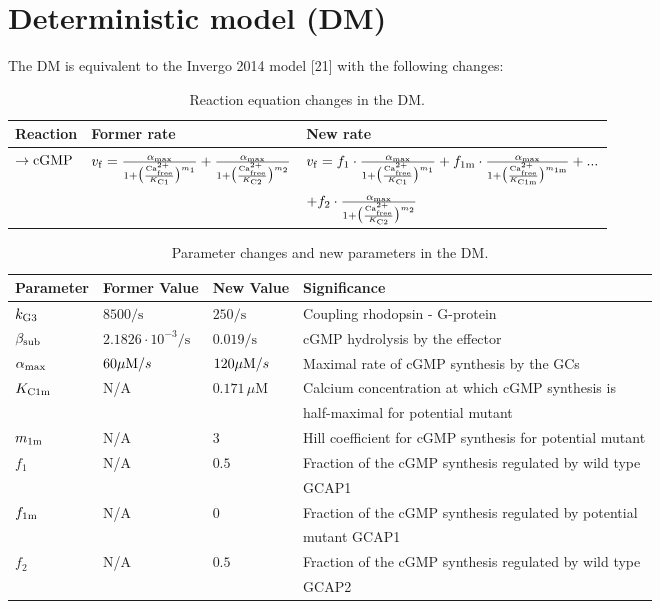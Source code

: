\documentclass[a4paper, 12pt]{book}
\begin{document}
\pagestyle{empty}

\section*{Deterministic model (DM)}

The DM is equivalent to the Invergo 2014 model [21] with the following changes:

\begin{table}[H]
\centering
\caption{Reaction equation changes in the DM.}
\label{tab_det_model}
\begin{tabular}{l | l | l}
Reaction & Former rate & New rate\\
\hline
\hline
$\rightarrow {\rm cGMP}$ & $v_{\rm f} = \frac{\alpha_{\rm max}}{1 + \bigl( \frac{{\rm Ca}^{2+}_{\rm free}}{K_{\rm C1}} \bigr)^{m_1}  } + \frac{\alpha_{\rm max}}{1 + \bigl( \frac{{\rm Ca}^{2+}_{\rm free}}{K_{\rm C2}} \bigr)^{m_2}  }  $ & $v_{\rm f} = f_1 \cdot \frac{\alpha_{\rm max}}{1+\bigl( \frac{{\rm Ca}^{2+}_{\rm free}}{K_{\rm C1}}\bigr)^{m_1}} + f_{\rm 1m} \cdot \frac{\alpha_{\rm max}}{1+\bigl( \frac{{\rm Ca}^{2+}_{\rm free}}{K_{\rm C1m}}\bigr)^{m_{\rm 1m}}} + ...$\\
 & & $ + f_2 \cdot \frac{\alpha_{\rm max}}{1+\bigl( \frac{{\rm Ca}^{2+}_{\rm free}}{K_{\rm C2}}\bigr)^{m_2}}$
\end{tabular}
\end{table}

\begin{table}[H]
\centering
\caption{Parameter changes and new parameters in the DM.}
\label{tab_det_model}
\begin{tabular}{l | l | l | l}
Parameter & Former Value & New Value & Significance\\
\hline
\hline
$k_{\rm G3}$ & $8500/\mathrm{s}$ & $250/\mathrm{s}$ & Coupling rhodopsin - G-protein\\
\hline
$\beta_{\rm sub}$ & $2.1826 \cdot 10^{-3}/\mathrm{s}$ & $0.019/\mathrm{s}$ & cGMP hydrolysis by the effector\\
\hline
$\alpha_{\rm max}$ & $60 \mu {\rm M}/s$ & $120 \mu {\rm M}/s$ & Maximal rate of cGMP synthesis by the GCs\\
\hline
$K_{\rm C1m}$ & N/A & $ 0.171\,\mu\mathrm{M}$ & Calcium concentration at which cGMP synthesis is\\
 & & &  half-maximal for potential mutant\\
\hline
$m_{\rm 1m}$ & N/A & $3$ & Hill coefficient for cGMP synthesis for potential mutant\\
\hline
$f_1$ & N/A & $0.5$ & Fraction of the cGMP synthesis regulated by wild type\\
 & & & GCAP1\\
\hline
$f_{\rm 1m}$ & N/A & $0$ & Fraction of the cGMP synthesis regulated by potential\\
 & & & mutant GCAP1\\
\hline
$f_2$ & N/A & $0.5$ & Fraction of the cGMP synthesis regulated by wild type\\
 & & & GCAP2\\
\end{tabular}
\end{table}
\end{document}
